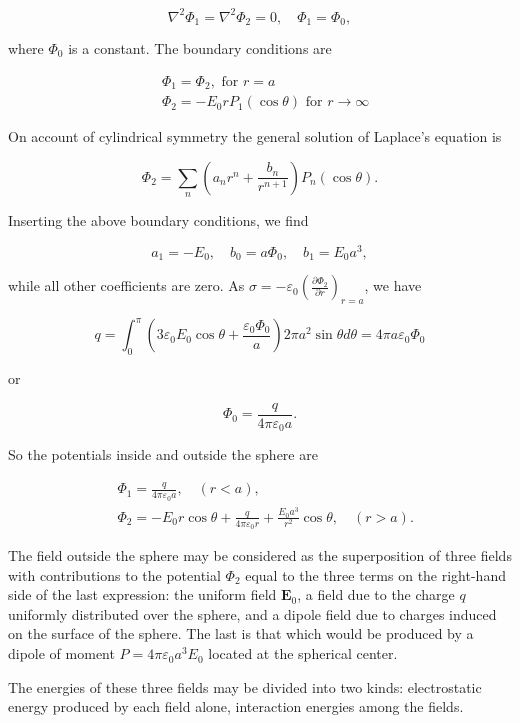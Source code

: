 \documentclass[10pt]{article}
\begin{document}
$$
\nabla^{2} \Phi_{1}=\nabla^{2} \Phi_{2}=0, \quad \Phi_{1}=\Phi_{0},
$$

where $\Phi_{0}$ is a constant. The boundary conditions are

$$
\begin{aligned}
&\Phi_{1}=\Phi_{2}, \text { for } r=a \\
&\Phi_{2}=-E_{0} r P_{1}(\cos \theta) \text { for } r \rightarrow \infty
\end{aligned}
$$

On account of cylindrical symmetry the general solution of Laplace's equation is

$$
\Phi_{2}=\sum_{n}\left(a_{n} r^{n}+\frac{b_{n}}{r^{n+1}}\right) P_{n}(\cos \theta) .
$$

Inserting the above boundary conditions, we find

$$
a_{1}=-E_{0}, \quad b_{0}=a \Phi_{0}, \quad b_{1}=E_{0} a^{3},
$$

while all other coefficients are zero. As $\sigma=-\varepsilon_{0}\left(\frac{\partial \Phi_{2}}{\partial r}\right)_{r=a}$, we have

$$
q=\int_{0}^{\pi}\left(3 \varepsilon_{0} E_{0} \cos \theta+\frac{\varepsilon_{0} \Phi_{0}}{a}\right) 2 \pi a^{2} \sin \theta d \theta=4 \pi a \varepsilon_{0} \Phi_{0}
$$

or

$$
\Phi_{0}=\frac{q}{4 \pi \varepsilon_{0} a} .
$$

So the potentials inside and outside the sphere are

$$
\begin{aligned}
&\Phi_{1}=\frac{q}{4 \pi \varepsilon_{0} a}, \quad(r<a), \\
&\Phi_{2}=-E_{0} r \cos \theta+\frac{q}{4 \pi \varepsilon_{0} r}+\frac{E_{0} a^{3}}{r^{2}} \cos \theta, \quad(r>a) .
\end{aligned}
$$

The field outside the sphere may be considered as the superposition of three fields with contributions to the potential $\Phi_{2}$ equal to the three terms on the right-hand side of the last expression: the uniform field $\mathbf{E}_{0}$, a field due to the charge $q$ uniformly distributed over the sphere, and a dipole field due to charges induced on the surface of the sphere. The last is that which would be produced by a dipole of moment $P=4 \pi \varepsilon_{0} a^{3} E_{0}$ located at the spherical center.

The energies of these three fields may be divided into two kinds: electrostatic energy produced by each field alone, interaction energies among the fields.
\end{document}
